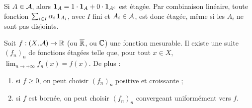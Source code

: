 \documentclass[11pt]{article}
\begin{document}
\begin{exemple}
Si $A \in \mathcal{A}$, alors $\mathbf{1}_A = 1\cdot\mathbf{1}_A + 0\cdot\mathbf{1}_{{A}^{c}}$ est étagée. Par combinaison linéaire, toute fonction $\sum_{i\in I}\alpha_i\,\mathbf{1}_{A_i}$, avec $I$ fini et $A_i \in \mathcal{A}$, est donc étagée, même si les $A_i$ ne sont pas disjoints.
\end{exemple}

\begin{theoreme}\label{thm:approximation}
Soit $f : (X,\mathcal{A}) \to \mathbb{R}$ (ou $\overline{\mathbb{R}}$, ou $\mathbb{C}$) une fonction mesurable. Il existe une suite $(f_n)_{n}$ de fonctions étagées telle que, pour tout $x \in X$, $\lim_{n\to+\infty}f_n(x) = f(x)$. De plus :
\begin{enumerate}[label=\roman*)]
  \item si $f \geq 0$, on peut choisir $(f_n)_n$ positive et croissante ;
  \item si $f$ est bornée, on peut choisir $(f_n)_n$ convergeant uniformément vers $f$.
\end{enumerate}
\end{theoreme}
\end{document}
